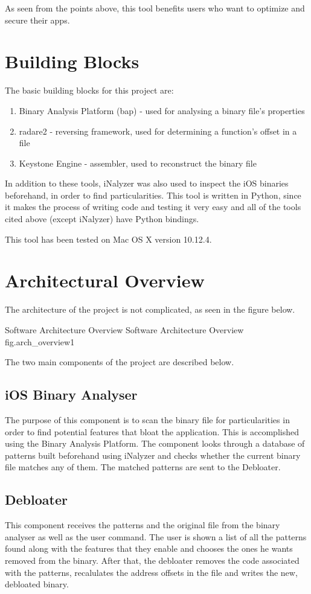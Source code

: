 As seen from the points above, this tool benefits users who want to optimize and secure
their apps.

\section{Building Blocks}
The basic building blocks for this project are:
\begin{enumerate}
	\item Binary Analysis Platform (bap) - used for analysing a binary file's properties
	\item radare2 - reversing framework, used for determining a function's offset in a file
	\item Keystone Engine - assembler, used to reconstruct the binary file
\end{enumerate}
In addition to these tools, iNalyzer was also used to inspect the iOS binaries beforehand,
in order to find particularities.
This tool is written in Python, since it makes the process of writing code and testing it very
easy and all of the tools cited above (except iNalyzer) have Python bindings.

This tool has been tested on Mac OS X version 10.12.4.

\section{Architectural Overview}
The architecture of the project is not complicated, as seen in the figure below.

%
	{Software Architecture Overview}%
	{Software Architecture Overview}%
	{fig.arch_overview}{1}

The two main components of the project are described below.
\subsection{iOS Binary Analyser}
The purpose of this component is to scan the binary file for particularities in order
to find potential features that bloat the application. This is accomplished using the
Binary Analysis Platform. The component looks through a database of patterns built beforehand
using iNalyzer and checks whether the current binary file matches any of them. The matched
patterns are sent to the Debloater.

\subsection{Debloater}
This component receives the patterns and the original file from the binary analyser as well as
the user command. The user is shown a list of all the patterns found along with the features that
they enable and chooses the ones he wants removed from the binary. After that, the debloater
removes the code associated with the patterns, recalulates the address offsets in the file and
writes the new, debloated binary.

